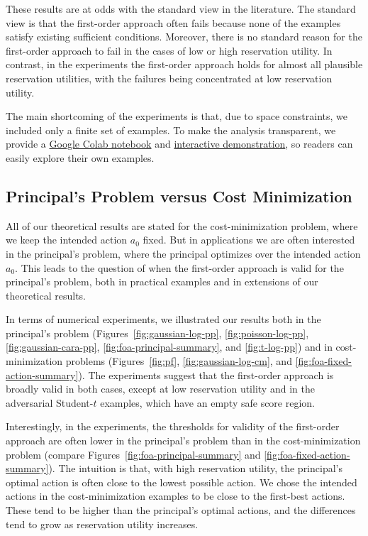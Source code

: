 These results are at odds with the standard view in the literature. The standard view is that the first-order approach often fails because none of the examples satisfy existing sufficient conditions. Moreover, there is no standard reason for the first-order approach to fail in the cases of low or high reservation utility. In contrast, in the experiments the first-order approach holds for almost all plausible reservation utilities, with the failures being concentrated at low reservation utility.

The main shortcoming of the experiments is that, due to space constraints, we included only a finite set of examples. To make the analysis transparent, we provide a \href{https://colab.research.google.com/github/eduardomazevedo/moralhazard/blob/main/examples/colab_demo.ipynb}{Google Colab notebook} and \href{https://eduardomazevedo.github.io/azevedo-wolff-2025-site/}{interactive demonstration}, so readers can easily explore their own examples.

\subsection{Principal's Problem versus Cost Minimization}
\label{sec:principal-versus-cost-minimization}

All of our theoretical results are stated for the cost-minimization problem, where we keep the intended action $a_0$ fixed. But in applications we are often interested in the principal's problem, where the principal optimizes over the intended action $a_0$. This leads to the question of when the first-order approach is valid for the principal's problem, both in practical examples and in extensions of our theoretical results.

In terms of numerical experiments, we illustrated our results both in the principal's problem (Figures~\ref{fig:gaussian-log-pp}, \ref{fig:poisson-log-pp}, \ref{fig:gaussian-cara-pp}, \ref{fig:foa-principal-summary}, and \ref{fig:t-log-pp}) and in cost-minimization problems (Figures~\ref{fig:pf}, \ref{fig:gaussian-log-cm}, and \ref{fig:foa-fixed-action-summary}). The experiments suggest that the first-order approach is broadly valid in both cases, except at low reservation utility and in the adversarial Student-$t$ examples, which have an empty safe score region.

Interestingly, in the experiments, the thresholds for validity of the first-order approach are often lower in the principal's problem than in the cost-minimization problem (compare Figures~\ref{fig:foa-principal-summary} and \ref{fig:foa-fixed-action-summary}). The intuition is that, with high reservation utility, the principal's optimal action is often close to the lowest possible action. We chose the intended actions in the cost-minimization examples to be close to the first-best actions. These tend to be higher than the principal's optimal actions, and the differences tend to grow as reservation utility increases.


